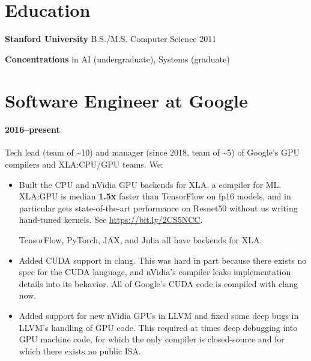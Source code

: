 \documentclass[12pt]{article}
\begin{document}
\begin{minipage}{0.65\textwidth}
\section*{Education}
\textbf{Stanford University} B.S./M.S. Computer Science 2011

\textbf{Concentrations} in AI (undergraduate), Systems (graduate)
\end{minipage}
%
\hfill\begin{minipage}{0.30\textwidth}
\vspace{-1.40em}
\raggedleft
{}
\end{minipage}

\section*{Software Engineer at Google}
\paragraph{2016--present} Tech lead (team of \textasciitilde{}10) and manager
(since 2018, team of \textasciitilde{}5) of Google's GPU compilers and
XLA:CPU/GPU teams.  We:

\begin{itemize}
\item Built the CPU and nVidia GPU backends for XLA, a compiler for ML.
  XLA:GPU is median \textbf{1.5x} faster than TensorFlow on fp16 models, and in
  particular gets state-of-the-art performance on Resnet50 without us writing
  hand-tuned kernels.  See \url{https://bit.ly/2CS5NCC}.
    
  TensorFlow, PyTorch, JAX, and Julia all have backends for XLA.

\item Added CUDA support in clang.  This was hard in part because there exists
  no spec for the CUDA language, and nVidia's compiler leaks implementation
  details into its behavior.  All of Google's CUDA code is compiled with
  clang now.

\item Added support for new nVidia GPUs in LLVM and fixed some deep bugs in
  LLVM's handling of GPU code.  This required at times deep debugging into GPU
  machine code, for which the only compiler is closed-source and for which
  there exists no public ISA.
\end{itemize}
\end{document}
